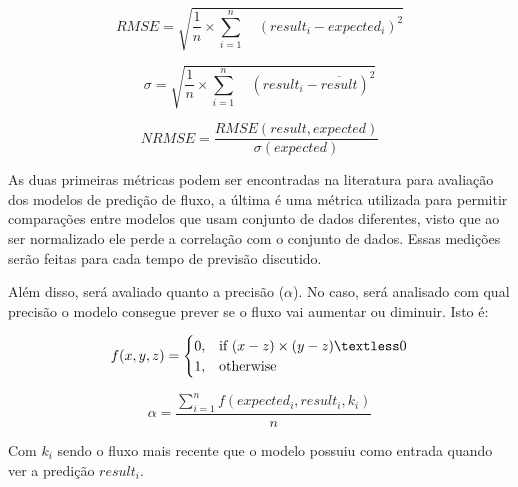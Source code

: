 \begin{equation}
RMSE = \sqrt{ \frac{1}{n} \times \sum_{i=1}^{n} \quad (result_i - expected_i) ^ 2}
\end{equation}

\begin{equation}
\sigma = \sqrt{ \frac{1}{n} \times \sum_{i=1}^{n} \quad (result_i - \overline{result}) ^ 2}
\end{equation}

\begin{equation}
NRMSE = \frac{RMSE(result, expected)}{\sigma(expected)}
\end{equation}

As duas primeiras métricas podem ser encontradas na literatura para avaliação dos modelos de predição de fluxo, a última é uma métrica utilizada para permitir comparações entre modelos que usam conjunto de dados diferentes, visto que ao ser normalizado ele perde a correlação com o conjunto de dados. Essas medições serão feitas para cada tempo de previsão discutido.

Além disso, será avaliado quanto a precisão (\(\alpha\)). No caso, será analisado com qual precisão o modelo consegue prever se o fluxo vai aumentar ou diminuir. Isto é:

\begin{equation}
f(x, y, z) =
\begin{cases}
  0, & \text{if}\ (x - z) \times (y - z) \textless 0 \\
  1, & \text{otherwise}
\end{cases}
\end{equation}

\begin{equation}
\alpha = \frac{\sum_{i=1}^{n} f(expected_i, result_i, k_i)}{n}
\end{equation}

Com \(k_i\) sendo o fluxo mais recente que o modelo possuiu como entrada quando ver a predição \(result_i\).